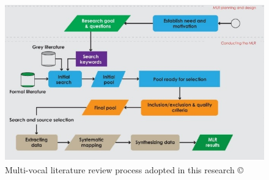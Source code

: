 \begin{figure}
  \includegraphics[width=\textwidth]{MLRprocess.jpg}
  \caption{Multi-vocal literature review process adopted in this research \copyright~\cite{SALTAN2021106510}}
 \label{fig:MLRprocess}
\end{figure}


